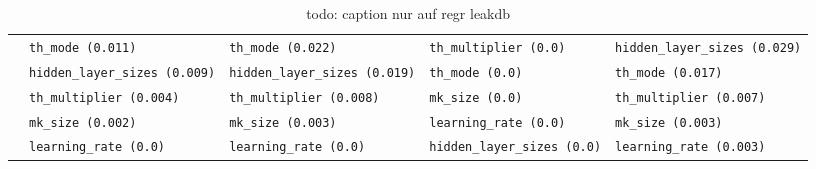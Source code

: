 \begin{table}[h]
\begin{adjustwidth}{-3.5cm}{}
\begin{tabular}{lllll}
                  & \texttt{th\_mode (0.011)}             & \texttt{th\_mode (0.022)}             & \texttt{th\_multiplier (0.0)}       & \texttt{hidden\_layer\_sizes (0.029)} \\
                  & \texttt{hidden\_layer\_sizes (0.009)} & \texttt{hidden\_layer\_sizes (0.019)} & \texttt{th\_mode (0.0)}             & \texttt{th\_mode (0.017)}             \\
                  & \texttt{th\_multiplier (0.004)}       & \texttt{th\_multiplier (0.008)}       & \texttt{mk\_size (0.0)}             & \texttt{th\_multiplier (0.007)}       \\
                  & \texttt{mk\_size (0.002)}             & \texttt{mk\_size (0.003)}             & \texttt{learning\_rate (0.0)}       & \texttt{mk\_size (0.003)}             \\
                  & \texttt{learning\_rate (0.0)}         & \texttt{learning\_rate (0.0)}         & \texttt{hidden\_layer\_sizes (0.0)} & \texttt{learning\_rate (0.003)}      
        \end{tabular}
        \caption{todo: caption nur auf regr leakdb}
    \end{adjustwidth}
\end{table}

